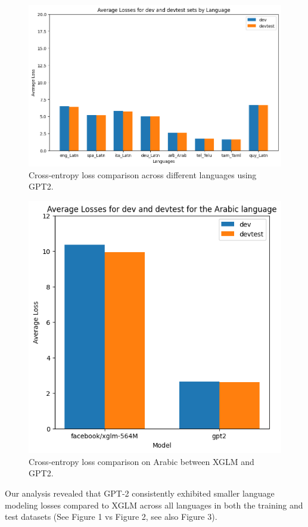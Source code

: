 \documentclass[11pt]{article}
\begin{document}
\begin{figure}[ht]
\centering
\includegraphics[width=0.9\columnwidth]{task1_gpt2_results.png}
\caption{Cross-entropy loss comparison across different languages using GPT2.}
\end{figure}

\begin{figure}[ht]
\centering
\includegraphics[width=0.9\columnwidth]{task1_modelComparison.png}
\caption{Cross-entropy loss comparison on Arabic between XGLM and GPT2.}
\end{figure}

Our analysis revealed that GPT-2 consistently exhibited smaller language modeling losses compared to XGLM across all languages in both the training and test datasets (See Figure 1 vs Figure 2, see also Figure 3).
\end{document}
